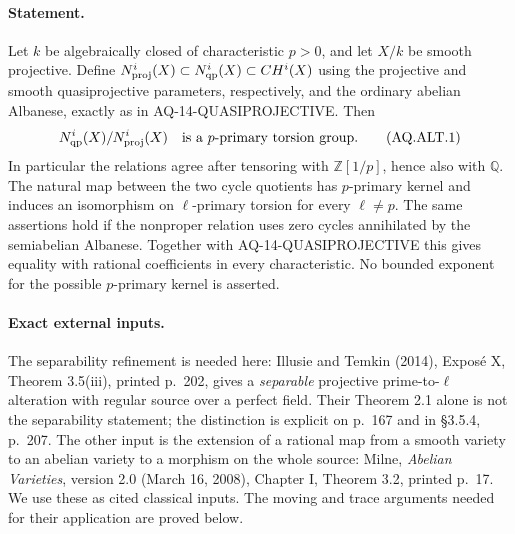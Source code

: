 \paragraph{Statement.}
Let $k$ be algebraically closed of characteristic $p>0$,
and let $X/k$ be smooth projective.  Define
$N^i_{\rm proj}(X)\subset N^i_{\rm qp}(X)\subset CH^i(X)$
using the projective and smooth quasiprojective parameters,
respectively, and the ordinary abelian Albanese, exactly as
in AQ-14-QUASIPROJECTIVE.  Then
\[
 N^i_{\rm qp}(X)/N^i_{\rm proj}(X)
 \quad\hbox{is a $p$-primary torsion group.}               \tag{AQ.ALT.1}
\]
In particular the relations agree after tensoring with
$\mathbb Z[1/p]$, hence also with $\mathbb Q$.
The natural map between the two cycle quotients has
$p$-primary kernel and induces an isomorphism on
$\ell$-primary torsion for every $\ell\ne p$.
The same assertions hold if the nonproper relation uses
zero cycles annihilated by the semiabelian Albanese.
Together with AQ-14-QUASIPROJECTIVE this gives equality
with rational coefficients in every characteristic.
No bounded exponent for the possible $p$-primary kernel
is asserted.

\paragraph{Exact external inputs.}
The separability refinement is needed here: Illusie and
Temkin (2014), Expos\'e X, Theorem 3.5(iii), printed p.~202,
gives a \emph{separable} projective prime-to-$\ell$ alteration
with regular source over a perfect field.  Their
Theorem 2.1 alone is not the separability statement;
the distinction is explicit on p.~167 and in \S3.5.4,
p.~207.  The other input is the extension of a rational
map from a smooth variety to an abelian variety to a
morphism on the whole source: Milne, \emph{Abelian
Varieties}, version 2.0 (March 16, 2008), Chapter I,
Theorem 3.2, printed p.~17.  We use these as cited
classical inputs.  The moving and trace arguments
needed for their application are proved below.

